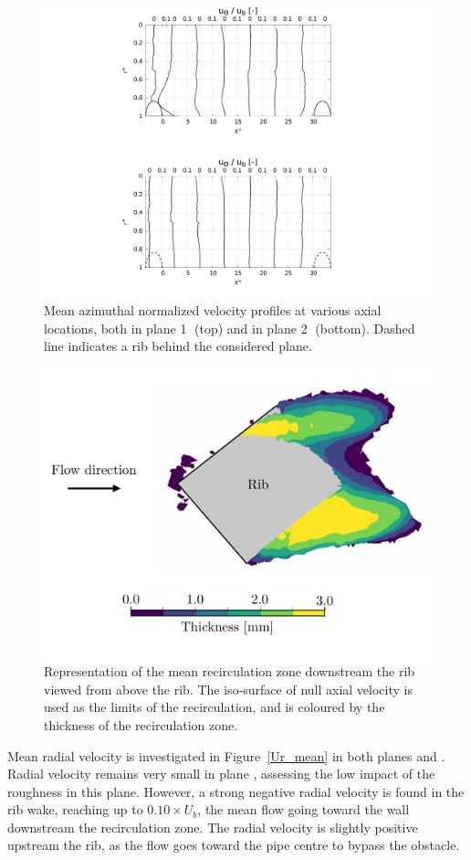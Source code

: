 \begin{figure}[h!]
\centering
\includegraphics[width=0.7\linewidth,keepaspectratio]{fig/applications/optim/Azimuthal_vel.pdf}
\caption{Mean azimuthal normalized velocity profiles at various axial locations, both in plane \textcircled{1} (top) and in plane \textcircled{2} (bottom). Dashed line indicates a rib behind the considered plane.}
\label{Uw_mean}
\end{figure}

\begin{figure}[!h]
\centering
\includegraphics[width=\linewidth]{fig/applications/optim/Recircul.pdf}
\caption{Representation of the mean recirculation zone downstream the rib viewed from above the rib. The iso-surface of null axial velocity is used as the limits of the recirculation, and is coloured by the thickness of the recirculation zone.}
\label{recircul}
\end{figure}

Mean radial velocity is investigated in Figure~\ref{Ur_mean} in both planes  and . Radial velocity remains very small in plane , assessing the low impact of the roughness in this plane. However, a strong negative radial velocity is found in the rib wake, reaching up to $0.10 \times U_b$, the mean flow going toward the wall downstream the recirculation zone. The radial velocity is slightly positive upstream the rib, as the flow goes toward the pipe centre to bypass the obstacle.

